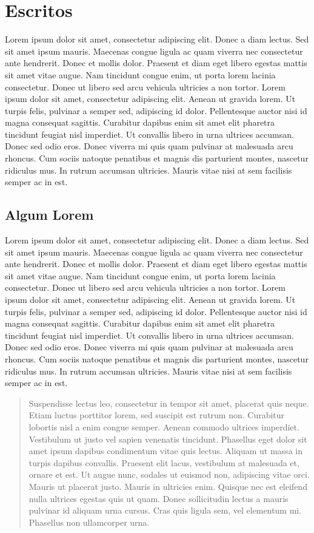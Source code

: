 \documentclass{article}
\begin{document}
\section{Escritos}

Lorem ipsum dolor sit amet, consectetur adipiscing elit. Donec a diam lectus. Sed sit amet ipsum mauris. Maecenas congue ligula ac quam viverra nec consectetur ante hendrerit. Donec et mollis dolor. Praesent et diam eget libero egestas mattis sit amet vitae augue. Nam tincidunt congue enim, ut porta lorem lacinia consectetur. Donec ut libero sed arcu vehicula ultricies a non tortor. Lorem ipsum dolor sit amet, consectetur adipiscing elit. Aenean ut gravida lorem. Ut turpis felis, pulvinar a semper sed, adipiscing id dolor. Pellentesque auctor nisi id magna consequat sagittis. Curabitur dapibus enim sit amet elit pharetra tincidunt feugiat nisl imperdiet. Ut convallis libero in urna ultrices accumsan. Donec sed odio eros. Donec viverra mi quis quam pulvinar at malesuada arcu rhoncus. Cum sociis natoque penatibus et magnis dis parturient montes, nascetur ridiculus mus. In rutrum accumsan ultricies. Mauris vitae nisi at sem facilisis semper ac in est.

\subsection{Algum Lorem}

Lorem ipsum \cite{italianos1987} dolor sit amet, consectetur adipiscing elit. Donec a diam lectus. Sed sit amet ipsum mauris. Maecenas congue ligula ac quam viverra nec consectetur ante hendrerit. Donec et mollis dolor. Praesent et diam eget libero egestas mattis sit amet vitae augue. Nam tincidunt congue enim, ut porta lorem lacinia consectetur. Donec ut libero sed arcu vehicula ultricies a non tortor. Lorem ipsum dolor sit amet, consectetur adipiscing elit. Aenean ut gravida lorem. Ut turpis felis, pulvinar a semper sed, adipiscing id dolor. Pellentesque auctor nisi id magna consequat sagittis. Curabitur dapibus enim sit amet elit pharetra tincidunt feugiat nisl imperdiet. Ut convallis libero in urna ultrices accumsan. Donec sed odio eros. Donec viverra mi quis quam pulvinar at malesuada arcu rhoncus. Cum sociis natoque penatibus et magnis dis parturient montes, nascetur ridiculus mus. In rutrum accumsan ultricies. Mauris vitae nisi at sem facilisis semper ac in est.

\begin{quote}
  Suspendisse lectus leo, consectetur in tempor sit amet, placerat quis neque. Etiam luctus porttitor lorem, sed suscipit est rutrum non. Curabitur lobortis nisl a enim congue semper. Aenean commodo ultrices imperdiet. Vestibulum ut justo vel sapien venenatis tincidunt. Phasellus eget dolor sit amet ipsum dapibus condimentum vitae quis lectus. Aliquam ut massa in turpis dapibus convallis. Praesent elit lacus, vestibulum at malesuada et, ornare et est. Ut augue nunc, sodales ut euismod non, adipiscing vitae orci. Mauris ut placerat justo. Mauris in ultricies enim. Quisque nec est eleifend nulla ultrices egestas quis ut quam. Donec sollicitudin lectus a mauris pulvinar id aliquam urna cursus. Cras quis ligula sem, vel elementum mi. Phasellus non ullamcorper urna.
\end{quote}
\end{document}
